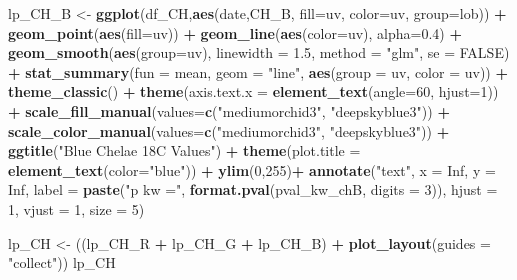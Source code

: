 \documentclass[
]{article}
\newenvironment{Shaded}{\begin{snugshade}}{\end{snugshade}}
\newcommand{\AttributeTok}[1]{\textcolor[rgb]{0.13,0.29,0.53}{#1}}
\newcommand{\ConstantTok}[1]{\textcolor[rgb]{0.56,0.35,0.01}{#1}}
\newcommand{\DecValTok}[1]{\textcolor[rgb]{0.00,0.00,0.81}{#1}}
\newcommand{\FloatTok}[1]{\textcolor[rgb]{0.00,0.00,0.81}{#1}}
\newcommand{\FunctionTok}[1]{\textcolor[rgb]{0.13,0.29,0.53}{\textbf{#1}}}
\newcommand{\NormalTok}[1]{#1}
\newcommand{\OtherTok}[1]{\textcolor[rgb]{0.56,0.35,0.01}{#1}}
\newcommand{\SpecialCharTok}[1]{\textcolor[rgb]{0.81,0.36,0.00}{\textbf{#1}}}
\newcommand{\StringTok}[1]{\textcolor[rgb]{0.31,0.60,0.02}{#1}}
\begin{document}
\begin{Shaded}
\begin{Highlighting}[]
\NormalTok{lp\_CH\_B }\OtherTok{\textless{}{-}} \FunctionTok{ggplot}\NormalTok{(df\_CH,}\FunctionTok{aes}\NormalTok{(date,CH\_B, }\AttributeTok{fill=}\NormalTok{uv, }\AttributeTok{color=}\NormalTok{uv, }\AttributeTok{group=}\NormalTok{lob)) }\SpecialCharTok{+}
  \FunctionTok{geom\_point}\NormalTok{(}\FunctionTok{aes}\NormalTok{(}\AttributeTok{fill=}\NormalTok{uv)) }\SpecialCharTok{+} \FunctionTok{geom\_line}\NormalTok{(}\FunctionTok{aes}\NormalTok{(}\AttributeTok{color=}\NormalTok{uv), }\AttributeTok{alpha=}\FloatTok{0.4}\NormalTok{) }\SpecialCharTok{+} 
  \FunctionTok{geom\_smooth}\NormalTok{(}\FunctionTok{aes}\NormalTok{(}\AttributeTok{group=}\NormalTok{uv), }\AttributeTok{linewidth =} \FloatTok{1.5}\NormalTok{, }\AttributeTok{method =} \StringTok{"glm"}\NormalTok{, }\AttributeTok{se =} \ConstantTok{FALSE}\NormalTok{) }\SpecialCharTok{+}
  \FunctionTok{stat\_summary}\NormalTok{(}\AttributeTok{fun =}\NormalTok{ mean, }\AttributeTok{geom =} \StringTok{"line"}\NormalTok{, }\FunctionTok{aes}\NormalTok{(}\AttributeTok{group =}\NormalTok{ uv, }\AttributeTok{color =}\NormalTok{ uv)) }\SpecialCharTok{+}
  \FunctionTok{theme\_classic}\NormalTok{() }\SpecialCharTok{+}
  \FunctionTok{theme}\NormalTok{(}\AttributeTok{axis.text.x =} \FunctionTok{element\_text}\NormalTok{(}\AttributeTok{angle=}\DecValTok{60}\NormalTok{, }\AttributeTok{hjust=}\DecValTok{1}\NormalTok{)) }\SpecialCharTok{+}
  \FunctionTok{scale\_fill\_manual}\NormalTok{(}\AttributeTok{values=}\FunctionTok{c}\NormalTok{(}\StringTok{"mediumorchid3"}\NormalTok{, }\StringTok{"deepskyblue3"}\NormalTok{)) }\SpecialCharTok{+}
  \FunctionTok{scale\_color\_manual}\NormalTok{(}\AttributeTok{values=}\FunctionTok{c}\NormalTok{(}\StringTok{"mediumorchid3"}\NormalTok{, }\StringTok{"deepskyblue3"}\NormalTok{)) }\SpecialCharTok{+}
  \FunctionTok{ggtitle}\NormalTok{(}\StringTok{"Blue Chelae 18C Values"}\NormalTok{) }\SpecialCharTok{+} 
  \FunctionTok{theme}\NormalTok{(}\AttributeTok{plot.title =} \FunctionTok{element\_text}\NormalTok{(}\AttributeTok{color=}\StringTok{"blue"}\NormalTok{)) }\SpecialCharTok{+}
  \FunctionTok{ylim}\NormalTok{(}\DecValTok{0}\NormalTok{,}\DecValTok{255}\NormalTok{)}\SpecialCharTok{+}
  \FunctionTok{annotate}\NormalTok{(}\StringTok{"text"}\NormalTok{, }\AttributeTok{x =} \ConstantTok{Inf}\NormalTok{, }\AttributeTok{y =} \ConstantTok{Inf}\NormalTok{, }
           \AttributeTok{label =} \FunctionTok{paste}\NormalTok{(}\StringTok{"p kw ="}\NormalTok{, }\FunctionTok{format.pval}\NormalTok{(pval\_kw\_chB, }\AttributeTok{digits =} \DecValTok{3}\NormalTok{)),}
           \AttributeTok{hjust =} \DecValTok{1}\NormalTok{, }\AttributeTok{vjust =} \DecValTok{1}\NormalTok{, }\AttributeTok{size =} \DecValTok{5}\NormalTok{)}

\NormalTok{lp\_CH }\OtherTok{\textless{}{-}}\NormalTok{ ((lp\_CH\_R }\SpecialCharTok{+}\NormalTok{ lp\_CH\_G }\SpecialCharTok{+}\NormalTok{ lp\_CH\_B) }\SpecialCharTok{+} \FunctionTok{plot\_layout}\NormalTok{(}\AttributeTok{guides =} \StringTok{"collect"}\NormalTok{))}
\NormalTok{lp\_CH}
\end{Highlighting}
\end{Shaded}
\end{document}
